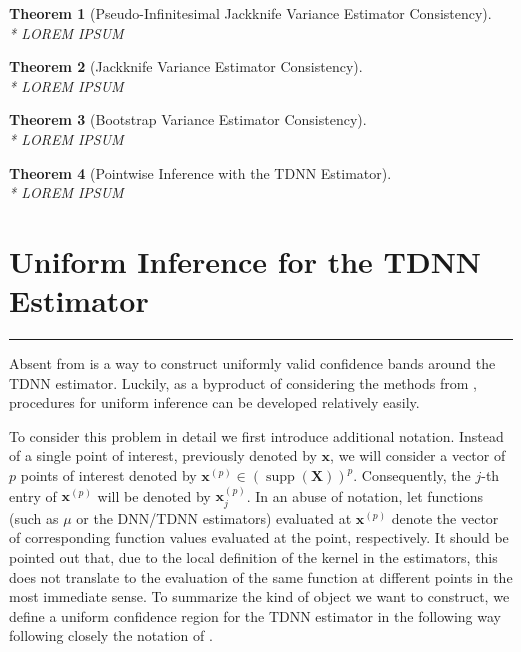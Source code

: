 \documentclass[letterpaper,10pt]{article}
\numberwithin{equation}{section}
\newtheorem{thm}{Theorem}
\numberwithin{thm}{section}
\numberwithin{lem}{section}
\numberwithin{cor}{section}
\renewcommand{\hat}{\widehat}
\newcommand{\1}{\mathbbm{1}}
\begin{document}
	{\color{red}
		\begin{thm}[Pseudo-Infinitesimal Jackknife Variance Estimator Consistency]\label{PI_JK_Cons}\mbox{}\\*
			LOREM IPSUM
		\end{thm}

		\begin{thm}[Jackknife Variance Estimator Consistency]\label{JK_Cons}\mbox{}\\*
			LOREM IPSUM
		\end{thm}

		\begin{thm}[Bootstrap Variance Estimator Consistency]\label{BS_Cons}\mbox{}\\*
			LOREM IPSUM
		\end{thm}

		\begin{thm}[Pointwise Inference with the TDNN Estimator]\label{pw_inf_TDNN}\mbox{}\\*
			LOREM IPSUM
		\end{thm}
	}

\newpage
\section{Uniform Inference for the TDNN Estimator}\label{unif_inf}
\hrule
Absent from \citet{demirkaya_optimal_2024} is a way to construct uniformly valid confidence bands around the TDNN estimator.
Luckily, as a byproduct of considering the methods from \citet{ritzwoller_uniform_2024}, procedures for uniform inference can be developed relatively easily.

To consider this problem in detail we first introduce additional notation.
Instead of a single point of interest, previously denoted by $\mathbf{x}$, we will consider a vector of $p$ points of interest denoted by $\mathbf{x}^{(p)} \in \left(\operatorname{supp}\left(\mathbf{X}\right)\right)^{p}$.
Consequently, the $j$-th entry of $\mathbf{x}^{(p)}$ will be denoted by $\mathbf{x}^{(p)}_{j}$.
In an abuse of notation, let functions (such as $\mu$ or the DNN/TDNN estimators) evaluated at $\mathbf{x}^{(p)}$ denote the vector of corresponding function values evaluated at the point, respectively.
It should be pointed out that, due to the local definition of the kernel in the estimators, this does not translate to the evaluation of the same function at different points in the most immediate sense.
To summarize the kind of object we want to construct, we define a uniform confidence region for the TDNN estimator in the following way following closely the notation of \citet{ritzwoller_uniform_2024}.
\end{document}
